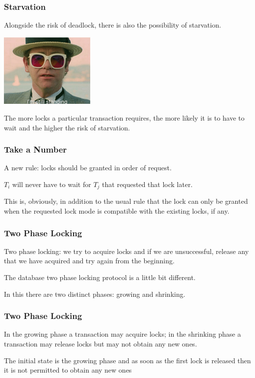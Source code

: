 \begin{frame}
\frametitle{Starvation}

Alongside the risk of deadlock, there is also the possibility of starvation. 

\begin{center}
	\includegraphics[width=0.35\textwidth]{images/stillstanding.png}
\end{center}

The more locks a particular transaction requires, the more likely it is to have to wait and the higher the risk of starvation.

\end{frame}

\begin{frame}
\frametitle{Take a Number}

A new rule: locks should be granted in order of request.

$T_{i}$ will never have to wait for $T_{j}$ that requested that lock later. 

This is, obviously, in addition to the usual rule that the lock can only be granted when the requested lock mode is compatible with the existing locks, if any. 

\end{frame}

\begin{frame}
\frametitle{Two Phase Locking}

Two phase locking: we try to acquire locks and if we are unsuccessful, release any that we have acquired and try again from the beginning. 

The database two phase locking protocol is a little bit different. 

In this there are two distinct phases: growing and shrinking. 

\end{frame}

\begin{frame}
\frametitle{Two Phase Locking}

In the growing phase a transaction may acquire locks; in the shrinking phase a transaction may release locks but may not obtain any new ones. 

The initial state is the growing phase and as soon as the first lock is released then it is not permitted to obtain any new ones

\end{frame}


